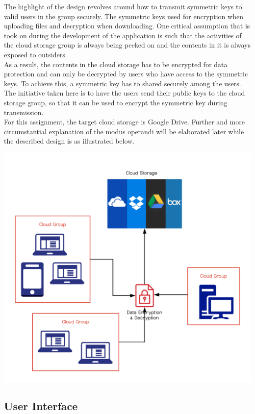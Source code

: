 \documentclass[12pt]{article}
\begin{document}
The highlight of the design revolves around how to transmit symmetric keys to valid users in the group securely. The symmetric keys used for encryption when uploading files and decryption when downloading. One critical assumption that is took on during the development of the application is such that the activities of the cloud storage group is always being peeked on and the contents in it is always exposed to outsiders. \\

As a result, the contents in the cloud storage has to be encrypted for data protection and can only be decrypted by users who have access to the symmetric keys. To achieve this, a symmetric key has to shared securely among the users. The initiative taken here is to have the users send their public keys to the cloud storage group, so that it can be used to encrypt the symmetric key during transmission. \\

For this assignment, the target cloud storage is Google Drive. Further and more circumstantial explanation of the modus operandi will be elaborated later while the described design is as illustrated below.
\begin{center}
\includegraphics[scale=0.55]{design}
\end{center}
\newpage
\subsection*{User Interface}
\end{document}
